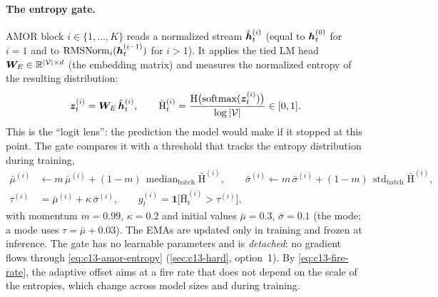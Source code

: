 \paragraph{The entropy gate.} AMOR block $i\in\{1,\dots,K\}$ reads a normalized stream
$\hat{\bm{h}}^{(i)}_t$ (equal to $\bm{h}^{(0)}_t$ for $i=1$ and to $\operatorname{RMSNorm}_i(\bm{h}^{(i-1)}_t)$ for $i>1$). It
applies the tied LM head $\bm{W}_E\in\mathbb{R}^{\left\lvert \mathcal{V}\right\rvert\times d}$ (the embedding matrix) and measures
the normalized entropy of the resulting distribution:
\begin{equation}\label{eq:c13-amor-entropy}
  \bm{z}^{(i)}_t = \bm{W}_E\,\hat{\bm{h}}^{(i)}_t,\qquad
  \bar{\mathrm{H}}^{(i)}_t = \frac{\mathrm{H}\bigl(\operatorname{softmax}(\bm{z}^{(i)}_t)\bigr)}{\log\left\lvert \mathcal{V}\right\rvert}\in[0,1].
\end{equation}
This is the ``logit lens'': the prediction the model would make if it stopped at this point. The
gate compares it with a threshold that tracks the entropy distribution during training,
\begin{align}
  \bar\mu^{(i)} &\leftarrow m\,\bar\mu^{(i)} + (1-m)\,\operatorname{median}_{\text{batch}}\bar{\mathrm{H}}^{(i)},\qquad
  \bar\sigma^{(i)} \leftarrow m\,\bar\sigma^{(i)} + (1-m)\,\operatorname{std}_{\text{batch}}\bar{\mathrm{H}}^{(i)},\label{eq:c13-amor-ema}\\
  \tau^{(i)} &= \bar\mu^{(i)} + \kappa\,\bar\sigma^{(i)},\qquad
  g^{(i)}_t = \mathbf{1}\bigl[\bar{\mathrm{H}}^{(i)}_t>\tau^{(i)}\bigr],\label{eq:c13-amor-gate}
\end{align}
with momentum $m=0.99$, $\kappa=0.2$ and initial values $\bar\mu=0.3$, $\bar\sigma=0.1$ (the
 mode; a  mode uses $\tau=\bar\mu+0.03$). The EMAs are updated only in
training and frozen at inference. The gate has no learnable parameters and is \emph{detached}: no
gradient flows through \eqref{eq:c13-amor-entropy} (\cref{sec:c13-hard}, option~1). By
\eqref{eq:c13-fire-rate}, the adaptive offset aims at a fire rate that does not depend on the scale of the
entropies, which change across model sizes and during training.

